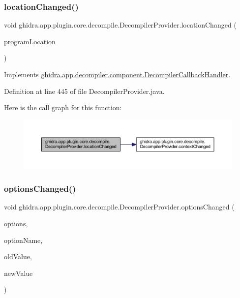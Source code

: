 \subsubsection{\texorpdfstring{locationChanged()}{locationChanged()}}
{\footnotesize\ttfamily void ghidra.\+app.\+plugin.\+core.\+decompile.\+Decompiler\+Provider.\+location\+Changed (\begin{DoxyParamCaption}\item[{Program\+Location}]{program\+Location }\end{DoxyParamCaption})\hspace{0.3cm}{\ttfamily [inline]}}



Implements \mbox{\hyperlink{interfaceghidra_1_1app_1_1decompiler_1_1component_1_1_decompiler_callback_handler_aca06fb5e7e930f4b89195dbdf60d95c3}{ghidra.\+app.\+decompiler.\+component.\+Decompiler\+Callback\+Handler}}.



Definition at line 445 of file Decompiler\+Provider.\+java.

Here is the call graph for this function\+:
\nopagebreak
\begin{figure}[H]
\begin{center}
\leavevmode
\includegraphics[width=350pt]{classghidra_1_1app_1_1plugin_1_1core_1_1decompile_1_1_decompiler_provider_afbefb9a625e7ff455be0aa5352f52347_cgraph}
\end{center}
\end{figure}
\mbox{\label{classghidra_1_1app_1_1plugin_1_1core_1_1decompile_1_1_decompiler_provider_a480fb4cdd2f86f488d1d269b53c0e872}} 
\subsubsection{\texorpdfstring{optionsChanged()}{optionsChanged()}}
{\footnotesize\ttfamily void ghidra.\+app.\+plugin.\+core.\+decompile.\+Decompiler\+Provider.\+options\+Changed (\begin{DoxyParamCaption}\item[{Tool\+Options}]{options,  }\item[{String}]{option\+Name,  }\item[{Object}]{old\+Value,  }\item[{Object}]{new\+Value }\end{DoxyParamCaption})\hspace{0.3cm}{\ttfamily [inline]}}



